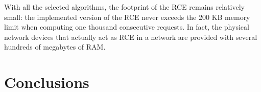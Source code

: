 \documentclass[10pt,a4paper]{report}
\begin{document}
With all the selected algorithms, the footprint of the RCE remains
relatively small: the implemented version of the RCE never exceeds the
200 KB memory limit when computing one thousand consecutive
requests. In fact, the physical network devices that actually act as
RCE in a network are provided with several hundreds of megabytes of
RAM.

\chapter{Conclusions}
\end{document}
